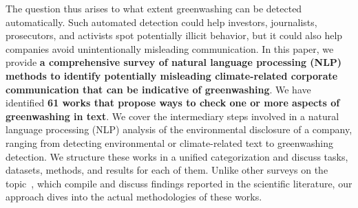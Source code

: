 The question thus arises to what extent greenwashing can be detected automatically.
Such automated detection could help investors, journalists, prosecutors, and activists spot potentially illicit behavior, but it could also help companies avoid unintentionally misleading communication. In this paper, we provide \textbf{a comprehensive survey of natural language processing (NLP) methods to identify potentially misleading climate-related corporate communication that can be indicative of greenwashing}. We have identified \textbf{61 works that propose ways to check one or more aspects of greenwashing in text}.
We cover the intermediary steps involved in a natural language processing (NLP) analysis of the environmental disclosure of a company, ranging from detecting environmental or climate-related text to greenwashing detection. We structure these works in a unified categorization and discuss tasks, datasets, methods, and results for each of them. Unlike other surveys on the topic~\cite{moodaley_greenwashing_2023, measuring_greenwashing}, which compile and discuss findings reported in the scientific literature, our approach dives into the actual methodologies of these works.

